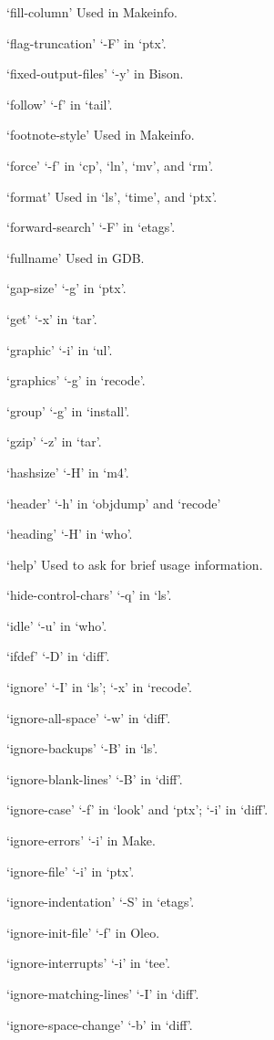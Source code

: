 `fill-column'
     Used in Makeinfo.

`flag-truncation'
     `-F' in `ptx'.

`fixed-output-files'
     `-y' in Bison.

`follow'
     `-f' in `tail'.

`footnote-style'
     Used in Makeinfo.

`force'
     `-f' in `cp', `ln', `mv', and `rm'.

`format'
     Used in `ls', `time', and `ptx'.

`forward-search'
     `-F' in `etags'.

`fullname'
     Used in GDB.

`gap-size'
     `-g' in `ptx'.

`get'
     `-x' in `tar'.

`graphic'
     `-i' in `ul'.

`graphics'
     `-g' in `recode'.

`group'
     `-g' in `install'.

`gzip'
     `-z' in `tar'.

`hashsize'
     `-H' in `m4'.

`header'
     `-h' in `objdump' and `recode'

`heading'
     `-H' in `who'.

`help'
     Used to ask for brief usage information.

`hide-control-chars'
     `-q' in `ls'.

`idle'
     `-u' in `who'.

`ifdef'
     `-D' in `diff'.

`ignore'
     `-I' in `ls'; `-x' in `recode'.

`ignore-all-space'
     `-w' in `diff'.

`ignore-backups'
     `-B' in `ls'.

`ignore-blank-lines'
     `-B' in `diff'.

`ignore-case'
     `-f' in `look' and `ptx'; `-i' in `diff'.

`ignore-errors'
     `-i' in Make.

`ignore-file'
     `-i' in `ptx'.

`ignore-indentation'
     `-S' in `etags'.

`ignore-init-file'
     `-f' in Oleo.

`ignore-interrupts'
     `-i' in `tee'.

`ignore-matching-lines'
     `-I' in `diff'.

`ignore-space-change'
     `-b' in `diff'.

